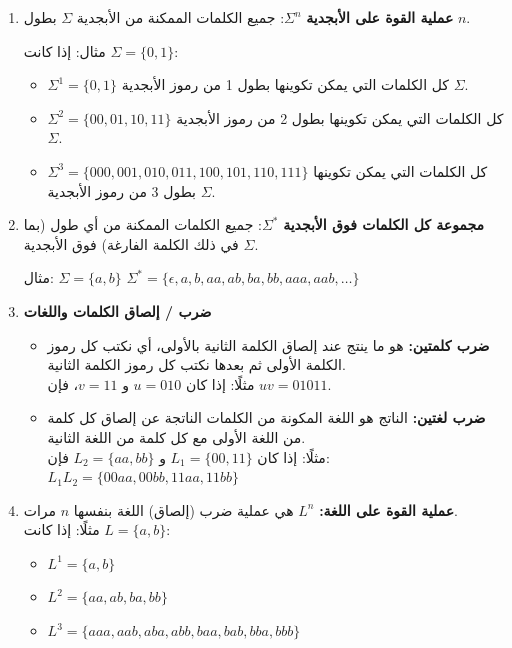 ﻿\documentclass[12pt]{article}
\begin{document}
\begin{enumerate}

\item
    \textbf{عملية القوة على الأبجدية} $\Sigma^n$: جميع الكلمات الممكنة من الأبجدية $\Sigma$ بطول $n$.

    مثال: إذا كانت $\Sigma = \{0,1\}$:
    \begin{itemize}
        \item $\Sigma^1 = \{0, 1\}$ كل الكلمات التي يمكن تكوينها بطول 1 من رموز الأبجدية $\Sigma$.
        \item $\Sigma^2 = \{00, 01, 10, 11\}$ كل الكلمات التي يمكن تكوينها بطول 2 من رموز الأبجدية $\Sigma$.
        \item $\Sigma^3 = \{000, 001, 010, 011, 100, 101, 110, 111\}$ كل الكلمات التي يمكن تكوينها بطول 3 من رموز الأبجدية $\Sigma$.
    \end{itemize}

\item
    \textbf{مجموعة كل الكلمات فوق الأبجدية} $\Sigma^*$: جميع الكلمات الممكنة من أي طول (بما في ذلك الكلمة الفارغة) فوق الأبجدية $\Sigma$.

    مثال: $\Sigma = \{a, b\}$
    $\Sigma^* = \{\epsilon, a, b, aa, ab, ba, bb, aaa, aab, \dots\}$

\item
    \textbf{ضرب / إلصاق الكلمات واللغات}
    \begin{itemize}
        \item \textbf{ضرب كلمتين:} هو ما ينتج عند إلصاق الكلمة الثانية بالأولى، أي نكتب كل رموز الكلمة الأولى ثم بعدها نكتب كل رموز الكلمة الثانية. \\
        مثلًا: إذا كان $u = 010$ و $v = 11$، فإن $uv = 01011$.
        \item \textbf{ضرب لغتين:} الناتج هو اللغة المكونة من الكلمات الناتجة عن إلصاق كل كلمة من اللغة الأولى مع كل كلمة من اللغة الثانية. \\
        مثلًا: إذا كان $L_1 = \{00,11\}$ و $L_2 = \{aa,bb\}$ فإن: $L_1L_2 = \{00aa, 00bb, 11aa, 11bb\}$
    \end{itemize}

\item
    \textbf{عملية القوة على اللغة:} $L^n$ هي عملية ضرب (إلصاق) اللغة بنفسها $n$ مرات. \\
    مثلًا: إذا كانت $L = \{a,b\}$:
    \begin{itemize}
        \item $L^1 = \{a,b\}$
        \item $L^2 = \{aa, ab, ba, bb\}$
        \item $L^3 = \{aaa, aab, aba, abb, baa, bab, bba, bbb\}$
    \end{itemize}


\end{enumerate}
\end{document}
